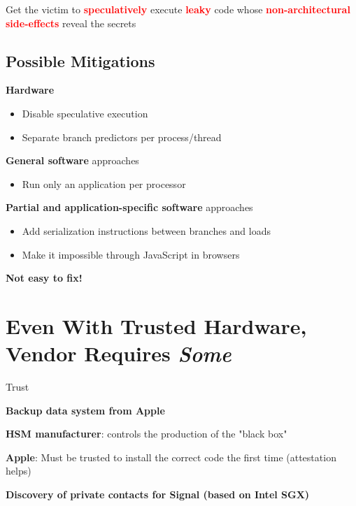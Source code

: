 \documentclass[11pt]{article}
\begin{document}
\begin{tcolorbox}[
  colback=yellow!15,     %
  colframe=black!50,    %
  boxrule=1pt,       %
  arc=3mm,             %
  left=4mm, right=4mm, top=2mm, bottom=2mm %
]
Get the victim to \textbf{\textcolor{red}{speculatively}} execute \textbf{\textcolor{red}{leaky}} code whose \textbf{\textcolor{red}{non-architectural side-effects}} reveal the secrets
\end{tcolorbox}

\subsection*{Possible Mitigations}

\textbf{Hardware}
\begin{itemize}
	\item Disable speculative execution
	\item Separate branch predictors per process/thread
\end{itemize}

\textbf{General software} approaches
\begin{itemize}
	\item Run only an application per processor
\end{itemize}

\textbf{Partial and application-specific software} approaches
\begin{itemize}
	\item Add serialization instructions between branches and loads
	\item Make it impossible through JavaScript in browsers
\end{itemize}

\textbf{Not easy to fix!}


\section*{Even With Trusted Hardware, Vendor Requires \textbf{\textit{Some}}} Trust

\textbf{Backup data system from Apple}

\textbf{HSM manufacturer}: controls the production of the "black box"

\textbf{Apple}: Must be trusted to install the correct code the first time (attestation helps)

\textbf{Discovery of private contacts for Signal (based on Intel SGX)}
\end{document}
